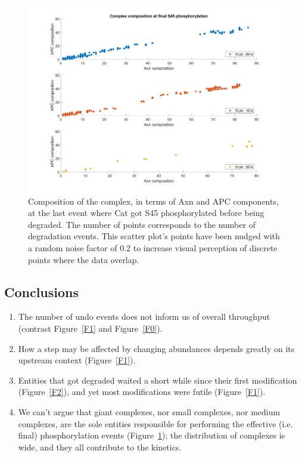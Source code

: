 \begin{figure}[h]
  \centering
  \includegraphics[width=\columnwidth]{wnt/F6_complex_composition_final_S45.png}
  \caption{Composition of the complex, in terms of Axn and APC
    components, at the last event where Cat got S45 phosphorylated
    before being degraded. The number of points corresponds to the number of
    degradation events. This scatter plot’s points have
    been nudged with a random noise factor of 0.2 to increase visual
    perception of discrete points where the data overlap.}
  \label{F6}
\end{figure}


\subsection{Conclusions}

\begin{enumerate}
\item The number of undo events does not inform us of overall
  throughput (contrast Figure~\ref{F1} and Figure~\ref{F0}).
\item How a step may be affected by changing abundances depends
  greatly on its upstream context (Figure~\ref{F1}).
\item Entities that got degraded waited a short while since their
  first modification (Figure~\ref{F2}), and yet most modifications
  were futile (Figure~\ref{F1}).
\item We can’t argue that giant complexes, nor small complexes, nor
  medium complexes, are the sole entities responsible for performing
  the effective (i.e. final) phosphorylation events  (Figure~\ref{F6}); %
  the distribution of complexes is wide, and they all contribute to
  the kinetics.
\end{enumerate}